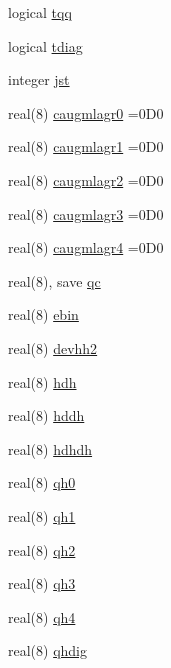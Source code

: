 \begin{DoxyCompactItemize}
\item 
logical \hyperlink{namespacestaticstep_a97336d9d1daa4f79275cfd369eb7b8a4}{tqq}
\item 
logical \hyperlink{namespacestaticstep_a3022db879b3a7ffd372a54b71707aca2}{tdiag}
\item 
integer \hyperlink{namespacestaticstep_a9aa7dee4efe93fca07853f6989b2f045}{jst}
\item 
real(8) \hyperlink{namespacestaticstep_a08feb669b9c0528696017b7ad3936faf}{caugmlagr0} =0\+D0
\item 
real(8) \hyperlink{namespacestaticstep_a871b7997d43b6cf4041af2bff9fbec5c}{caugmlagr1} =0\+D0
\item 
real(8) \hyperlink{namespacestaticstep_a814978f5b3d656fb78dc29ccf7d29190}{caugmlagr2} =0\+D0
\item 
real(8) \hyperlink{namespacestaticstep_af93a45372644d111a6b47d25cfa22362}{caugmlagr3} =0\+D0
\item 
real(8) \hyperlink{namespacestaticstep_a41e727f971f8eb424c2156762148abc3}{caugmlagr4} =0\+D0
\item 
real(8), save \hyperlink{namespacestaticstep_ab1b2fd7b191b5100bb31d5b02df28d67}{qc}
\item 
real(8) \hyperlink{namespacestaticstep_aee43c6b0cea94f1487aed360ca42fcb4}{ebin}
\item 
real(8) \hyperlink{namespacestaticstep_a6be970f33ea95ee3b6c1553e88748961}{devhh2}
\item 
real(8) \hyperlink{namespacestaticstep_a356065bb46b188687661cc58f93d058d}{hdh}
\item 
real(8) \hyperlink{namespacestaticstep_a31efc0c841017e316500c37afcf7dc8a}{hddh}
\item 
real(8) \hyperlink{namespacestaticstep_aa7f31f9f91a7710115dc3b41e204a17a}{hdhdh}
\item 
real(8) \hyperlink{namespacestaticstep_a41743f17b5730664e6c770a4d4ea2110}{qh0}
\item 
real(8) \hyperlink{namespacestaticstep_a91a6199d4eec95cff08b94738690894a}{qh1}
\item 
real(8) \hyperlink{namespacestaticstep_a897519f2def07749c367f0380bdc452a}{qh2}
\item 
real(8) \hyperlink{namespacestaticstep_ade5f5f5eb8e4fe1c8c95cbbfe3eab7fb}{qh3}
\item 
real(8) \hyperlink{namespacestaticstep_a565f7e97adec7cf001d80bcbeb5294b9}{qh4}
\item 
real(8) \hyperlink{namespacestaticstep_a03eb2b19fb183c4ec6075241077232ca}{qhdig}

\end{DoxyCompactItemize}
